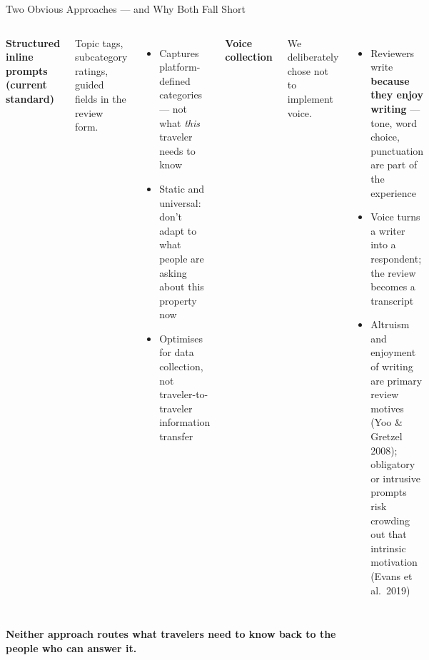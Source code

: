 \documentclass[aspectratio=169,10pt]{beamer}
\newcommand{\shead}[1]{\smallskip\textbf{#1}\par\smallskip}
\begin{document}
\begin{frame}{Two Obvious Approaches --- and Why Both Fall Short}

\begin{columns}[T]
\shead{Structured inline prompts (current standard)}
Topic tags, subcategory ratings, guided fields in the review form.
\begin{itemize}
  \item Captures platform-defined categories --- not what \textit{this} traveler needs to know
  \item Static and universal: don't adapt to what people are asking about this property now
  \item Optimises for data collection, not traveler-to-traveler information transfer
\end{itemize}

\shead{Voice collection}
We deliberately chose not to implement voice.
\begin{itemize}
  \item Reviewers write \textbf{because they enjoy writing} --- tone, word choice, punctuation are part of the experience
  \item Voice turns a writer into a respondent; the review becomes a transcript
  \item Altruism and enjoyment of writing are primary review motives (Yoo \& Gretzel 2008); obligatory or intrusive prompts risk crowding out that intrinsic motivation (Evans et al.\ 2019)
\end{itemize}
\end{columns}

\smallskip
\textbf{Neither approach routes what travelers need to know back to the people who can answer it.}

\end{frame}
\end{document}
